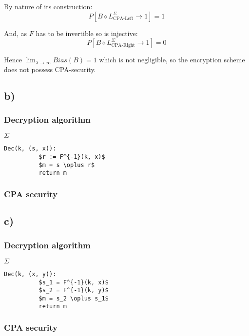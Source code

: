 \documentclass[a4paper]{scrreprt}
\begin{document}
By nature of its construction:
\[
	P[B \diamond L^{\Sigma}_{\text{CPA-Left}} \rightarrow 1] = 1
\]

And, as $F$ has to be invertible so is injective:
\[
	P[B \diamond L^{\Sigma}_{\text{CPA-Right}} \rightarrow 1] = 0
\]

Hence $\lim_{\lambda \to \infty} Bias(B) = 1$ which is not negligible,
so the encryption scheme does not possess CPA-security.

\subsection{b)}

\subsubsection{Decryption algorithm}

\begin{library}{$\Sigma$}
	\begin{lstlisting}[mathescape=true,autogobble=true]
		Dec(k, (s, x)):
		  $r := F^{-1}(k, x)$
		  $m = s \oplus r$
		  return m
	\end{lstlisting}
\end{library}

\subsubsection{CPA security}


\subsection{c)}

\subsubsection{Decryption algorithm}

\begin{library}{$\Sigma$}
	\begin{lstlisting}[mathescape=true,autogobble=true]
		Dec(k, (x, y)):
		  $s_1 = F^{-1}(k, x)$
		  $s_2 = F^{-1}(k, y)$
		  $m = s_2 \oplus s_1$
		  return m
	\end{lstlisting}
\end{library}

\subsubsection{CPA security}
\end{document}
